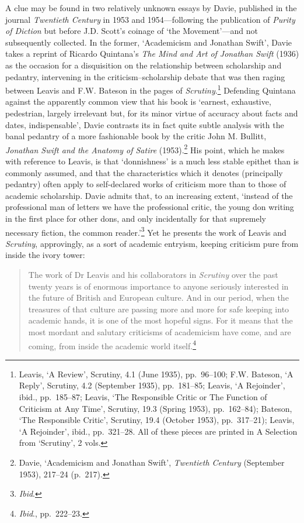 \documentclass[]{article}
\begin{document}
A clue may be found in two relatively unknown essays by Davie, published
in the journal \emph{Twentieth Century} in 1953 and 1954---following the
publication of \emph{Purity of Diction} but before J.D. Scott's coinage
of `the Movement'---and not subsequently collected. In the former,
`Academicism and Jonathan Swift', Davie takes a reprint of Ricardo
Quintana's \emph{The Mind and Art of Jonathan Swift} (1936) as the
occasion for a disquisition on the relationship between scholarship and
pedantry, intervening in the criticism--scholarship debate that was then
raging between Leavis and F.W. Bateson in the pages of
\emph{Scrutiny}.\footnote{Leavis, `A Review', Scrutiny, 4.1 (June 1935),
  pp.~96--100; F.W. Bateson, `A Reply', Scrutiny, 4.2 (September 1935),
  pp.~181--85; Leavis, `A Rejoinder', ibid., pp.~185--87; Leavis, `The
  Responsible Critic or The Function of Criticism at Any Time',
  Scrutiny, 19.3 (Spring 1953), pp.~162--84); Bateson, `The Responsible
  Critic', Scrutiny, 19.4 (October 1953), pp.~317--21); Leavis, `A
  Rejoinder', ibid., pp.~321--28. All of these pieces are printed in A
  Selection from `Scrutiny', 2 vols.} Defending Quintana against the
apparently common view that his book is `earnest, exhaustive,
pedestrian, largely irrelevant but, for its minor virtue of accuracy
about facts and dates, indispensable', Davie contrasts its in fact quite
subtle analysis with the banal pedantry of a more fashionable book by
the critic John M. Bullitt, \emph{Jonathan Swift and the Anatomy of
Satire} (1953).\footnote{Davie, `Academicism and Jonathan Swift',
  \emph{Twentieth Century} (September 1953), 217--24 (p.~217).} His
point, which he makes with reference to Leavis, is that `donnishness' is
a much less stable epithet than is commonly assumed, and that the
characteristics which it denotes (principally pedantry) often apply to
self-declared works of criticism more than to those of academic
scholarship. Davie admits that, to an increasing extent, `instead of the
professional man of letters we have the professional critic, the young
don writing in the first place for other dons, and only incidentally for
that supremely necessary fiction, the common reader.'\footnote{\emph{Ibid}.}
Yet he presents the work of Leavis and \emph{Scrutiny}, approvingly, as
a sort of academic entryism, keeping criticism pure from inside the
ivory tower:

\begin{quote}
The work of Dr Leavis and his collaborators in \emph{Scrutiny} over the
past twenty years is of enormous importance to anyone seriously
interested in the future of British and European culture. And in our
period, when the treasures of that culture are passing more and more for
safe keeping into academic hands, it is one of the most hopeful signs.
For it means that the most mordant and salutary criticisms of
academicism have come, and are coming, from inside the academic world
itself.\footnote{\emph{Ibid}., pp.~222--23.}
\end{quote}
\end{document}

